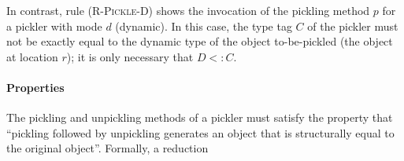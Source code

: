 \documentclass[preprint,10pt]{sigplanconf}
\theoremstyle{definition}
\theoremstyle{definition}
\newcommand{\ba}{\begin{array}}
\newcommand{\ea}{\end{array}}
\newcommand{\sub}{<:}
\newcommand{\sreducestar}[6]{#1, #2, #3 \;\longrightarrow^{\ast}\; #4, #5, #6}
\begin{document}
In contrast, rule \textsc{(R-Pickle-D)} shows the invocation of the pickling
method $p$ for a pickler with mode $d$ (dynamic). In this case, the type tag
$C$ of the pickler must not be exactly equal to the dynamic type of the object
to-be-pickled (the object at location $r$); it is only necessary that $D \sub
C$.

\paragraph{Properties} The pickling and unpickling methods of a pickler must
satisfy the property that ``pickling followed by unpickling generates an
object that is structurally equal to the original object''. Formally, a reduction













\end{document}

